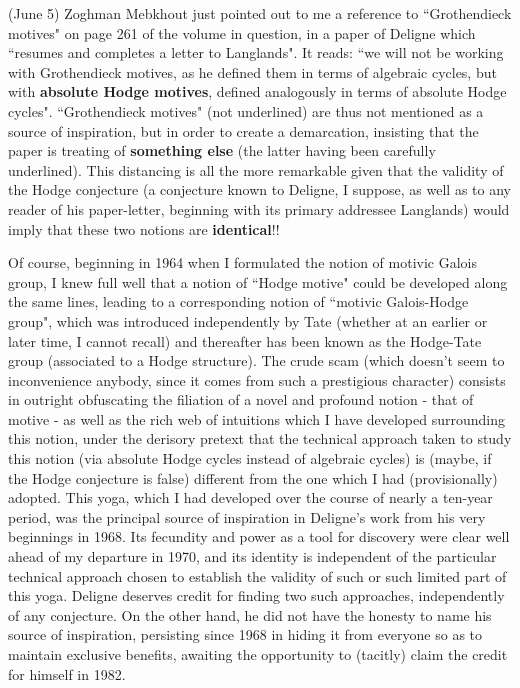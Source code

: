 \label{note:51.1} (June 5) Zoghman Mebkhout just pointed out to me a reference to ``Grothendieck motives" on page 261 of the volume in question, in a paper of Deligne which ``resumes and completes a letter to Langlands". It reads: ``we will not be working with Grothendieck motives, as he defined them in terms of algebraic cycles, but with \textbf{absolute Hodge motives}, defined analogously in terms of absolute Hodge cycles". ``Grothendieck motives" (not underlined) are thus not mentioned as a source of inspiration, but in order to create a demarcation, insisting that the paper is treating of \textbf{something else} (the latter having been carefully underlined). This distancing is all the more remarkable given that the validity of the Hodge conjecture (a conjecture known to Deligne, I suppose, as well as to any reader of his paper-letter, beginning with its primary addressee Langlands) would imply that these two notions are \textbf{identical}!!

Of course, beginning in 1964 when I formulated the notion of motivic Galois group, I knew full well that a notion of ``Hodge motive" could be developed along the same lines, leading to a corresponding notion of ``motivic Galois-Hodge group", which was introduced independently by Tate (whether at an earlier or later time, I cannot recall) and thereafter has been known as the Hodge-Tate group (associated to a Hodge structure). The crude scam (which doesn't seem to inconvenience anybody, since it comes from such a prestigious character) consists in outright obfuscating the filiation of a novel and profound notion - that of motive - as well as the rich web of intuitions which I have developed surrounding this notion, under the derisory pretext that the technical approach taken to study this notion (via absolute Hodge cycles instead of algebraic cycles) is (maybe, if the Hodge conjecture is false) different from the one which I had (provisionally) adopted. This yoga, which I had developed over the course of nearly a ten-year period, was the principal source of inspiration in Deligne's work from his very beginnings in 1968. Its fecundity and power as a tool for discovery were clear well ahead of my departure in 1970, and its identity is independent of the particular technical approach chosen to establish the validity of such or such limited part of this yoga. Deligne deserves credit for finding two such approaches, independently of any conjecture. On the other hand, he did not have the honesty to name his source of inspiration, persisting since 1968 in hiding it from everyone so as to maintain exclusive benefits, awaiting the opportunity to (tacitly) claim the credit for himself in 1982.


